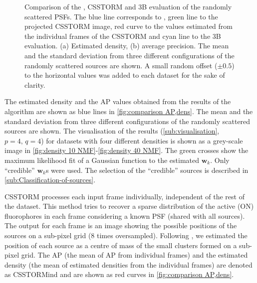 \begin{figure}[!h]
	\centering
	\newcommand{\sizef}{.38}
	
	\caption{Comparison of the \inmf{}, CSSTORM and 3B evaluation of the randomly scattered PSFs. The blue line corresponds to \inmf{}, green line to the projected CSSTORM image, red curve to the values estimated from the individual frames of the CSSTORM and cyan line to the 3B evaluation. (a) Estimated density, (b) average precision. The mean and the standard deviation from three different configurations of the randomly scattered sources are shown. A small random offset ($\pm0.5$) to the horizontal values was added to each dataset for the sake of clarity.}
	\label{fig:comparison AP,dens}
\end{figure}
%
The estimated density and the AP values obtained from the results of the \inmf{} algorithm are shown as blue lines in \autoref{fig:comparison AP,dens}. The mean and the standard deviation from three different configurations of the randomly scattered sources are shown. The visualisation of the results (\autoref{sub:visualisation}, $p=4,\,q=4$) for datasets with four different densities is shown as a grey-scale image in \autoref{fig:density 10 NMF}-\ref{fig:density 40 NMF}. The green crosses show the maximum likelihood fit of a Gaussian function to the \inmf{} estimated $\bm{w}_k$. Only ``credible'' $\bm{w}_k$s were used. The selection of the ``credible'' sources is described in \autoref{sub:Classification-of-sources}.

CSSTORM processes each input frame individually, independent of the rest of the dataset. This method tries to recover a sparse distribution of the active (ON) fluorophores in each frame considering a known PSF (shared with all sources). The output for each frame is an image showing the possible positions of the sources on a sub-pixel grid (8 times oversampled). Following \cite{Zhu2012}, we estimated the position of each source as a centre of mass of the small clusters formed on a sub-pixel grid. The AP (the mean of AP from individual frames) and the estimated density (the mean of estimated densities from the individual frames) are denoted as \textsf{CSSTORMind} and are shown as red curves in \autoref{fig:comparison AP,dens}. 

